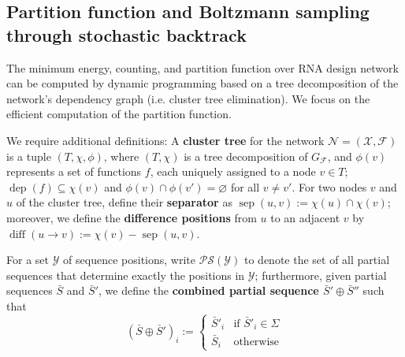 \documentclass{bioinfo}
\newcommand{\network}{\mathcal{N}}
\newcommand{\val}{\bar S} %
\newcommand{\dep}{\operatorname{dep}}
\newcommand{\energy}[1]{\operatorname{e}_{#1}}
\newcommand{\numberof}{\operatorname{\#}}
\newcommand{\partfun}[1]{\mathcal{Z}_{#1}}
\newcommand{\separator}[2]{\operatorname{sep}(#1,#2)}
\newcommand{\difference}[2]{\operatorname{diff}(#1 \rightarrow #2)}
\newcommand{\partseqs}{\mathcal{P\!S}}
\newcommand{\F}{\mathcal{F}}
\newcommand{\X}{\mathcal{X}}
\newcommand{\Y}{\mathcal{Y}}
\newcommand{\Def}[1]{{\bfseries #1}}
\newcommand{\evalfor}[2]{#1\llbracket{}#2\rrbracket{}}
\newcommand{\substitute}[2]{#1\!\oplus\!#2}
\begin{document}


\subsection{Partition function and Boltzmann sampling through stochastic backtrack}\label{sec:PF}
The minimum energy, counting, and partition function
over RNA design network can be computed by dynamic programming based
on a tree decomposition of the network's dependency graph
(i.e. cluster tree elimination).
We focus on the efficient computation of the partition
function. %

%

We require additional definitions: A \Def{cluster tree} for the
network $\network=(\X,\F)$ is a tuple $(T,\chi,\phi)$, where
$(T,\chi)$ is a tree decomposition of $G_\F$, and $\phi(v)$ represents
a set of functions $f$, each uniquely assigned to a node $v\in T$;
$\dep(f)\subseteq\chi(v)$ and $\phi(v)\cap \phi(v')=\varnothing$ for
all $v\neq v'$.  For two nodes $v$ and $u$ of the cluster tree, define
their \Def{separator} as $\separator{u}{v} := \chi(u)\cap\chi(v)$;
moreover, we define the \Def{difference positions} from $u$ to an
adjacent $v$ by $\difference{u}{v}:=\chi(v) - \separator{u}{v}$.

For a set $\Y$ of sequence positions, write $\partseqs(\Y)$ to
denote the set of all partial sequences that determine exactly the positions
in $\Y$; furthermore, given partial sequences $\val$ and
$\val'$, we define the \Def{combined partial sequence $\substitute{\val'}{\val''}$} such that
$$
(\substitute{\val}{\val'})_i :=
\begin{cases}
  \val'_i & \text{if } \val'_i\in \Sigma\\
  \val_i & \text{otherwise}
\end{cases}
$$
\end{document}
